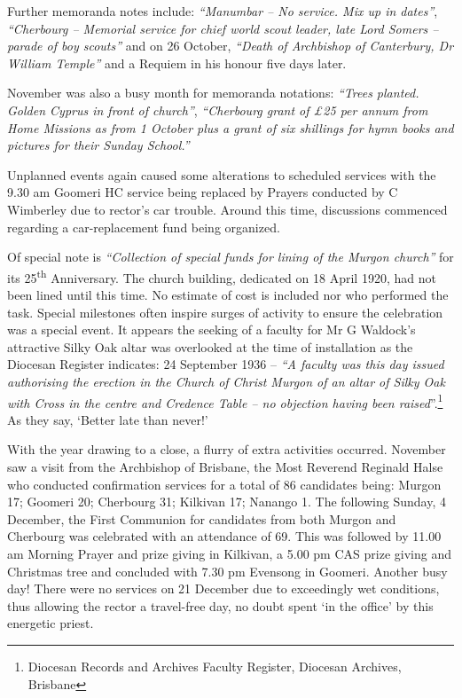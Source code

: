 Further memoranda notes include: \emph{``Manumbar -- No service. Mix up in dates''}, \emph{``Cherbourg -- Memorial service for chief world scout leader, late Lord Somers -- parade of boy scouts''} and on 26 October, \emph{``Death of Archbishop of Canterbury, Dr William Temple''} and a Requiem in his honour five days later.

November was also a busy month for memoranda notations: \emph{``Trees planted. Golden Cyprus in front of church''}, \emph{``Cherbourg grant of £25 per annum from Home Missions as from 1 October plus a grant of six shillings for hymn books and pictures for their Sunday School.''}

Unplanned events again caused some alterations to scheduled services with the 9.30 am Goomeri HC service being replaced by Prayers conducted by C Wimberley due to rector's car trouble. Around this time, discussions commenced regarding a car-replacement fund being organized.

Of special note is \emph{``Collection of special funds for lining of the Murgon church''} for its 25\textsuperscript{th} Anniversary. The church building, dedicated on 18 April 1920, had not been lined until this time. No estimate of cost is included nor who performed the task. Special milestones often inspire surges of activity to ensure the celebration was a special event. It appears the seeking of a faculty for Mr G Waldock's attractive Silky Oak altar was overlooked at the time of installation as the Diocesan Register indicates: 24 September 1936 -- \emph{``A faculty was this day issued authorising the erection in the Church of Christ Murgon of an altar of Silky Oak with Cross in the centre and Credence Table -- no objection having been raised}''.\footnote{Diocesan Records and Archives Faculty Register, Diocesan Archives, Brisbane} As they say, `Better late than never!'

With the year drawing to a close, a flurry of extra activities occurred. November saw a visit from the Archbishop of Brisbane, the Most Reverend Reginald Halse who conducted confirmation services for a total of 86 candidates being: Murgon 17; Goomeri 20; Cherbourg 31; Kilkivan 17; Nanango 1. The following Sunday, 4 December, the First Communion for candidates from both Murgon and Cherbourg was celebrated with an attendance of 69. This was followed by 11.00 am Morning Prayer and prize giving in Kilkivan, a 5.00 pm CAS prize giving and Christmas tree and concluded with 7.30 pm Evensong in Goomeri. Another busy day! There were no services on 21 December due to exceedingly wet conditions, thus allowing the rector a travel-free day, no doubt spent `in the office' by this energetic priest.

